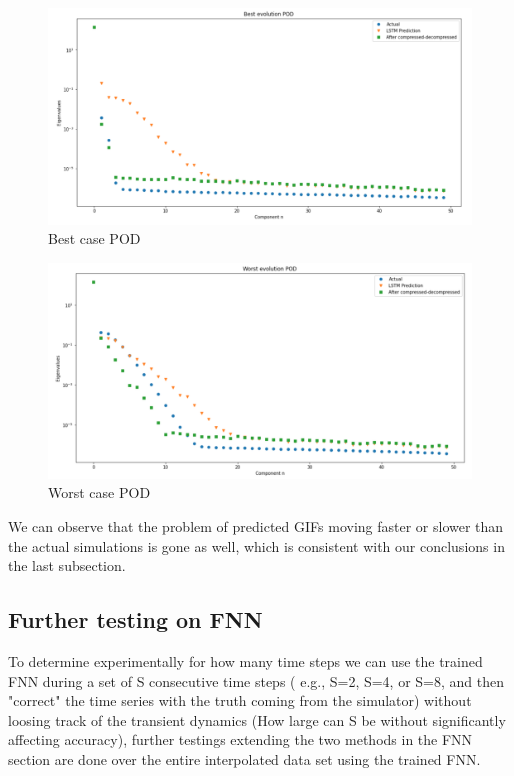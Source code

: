 \begin{figure}[H]
    \caption{Best case POD}
    \includegraphics[scale=0.5]{Report LaTeX/figures/mantle_convection_images/larger_dataset_interpolated/LSTM_Best_POD.png}
\end{figure}

\begin{figure}[H]
    \caption{Worst case POD}
    \includegraphics[scale=0.5]{Report LaTeX/figures/mantle_convection_images/larger_dataset_interpolated/LSTM_Worst_POD.png}
\end{figure}


We can observe that the problem of predicted GIFs moving faster or slower than the actual simulations is gone as well, which is consistent with our conclusions in the last subsection.


\subsection{Further testing on FNN}

To determine experimentally for how many time steps we can use the trained FNN during a set of S consecutive time steps ( e.g., S=2, S=4, or S=8, and then "correct" the time series with the truth coming from the simulator) without loosing track of the transient dynamics (How large can S be without significantly affecting accuracy), further testings extending the two methods in the FNN section are done over the entire interpolated data set using the trained FNN.

